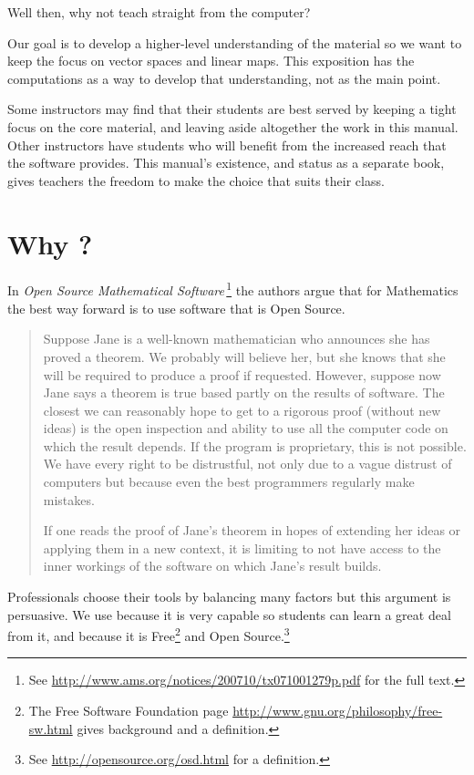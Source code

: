 Well then, why 
not teach straight from the computer?

Our goal is to 
develop a higher-level understanding of the material so we want to  
keep the focus on vector spaces and linear maps.
This exposition has 
the computations as a way to develop that understanding, not as the main point.

Some instructors may find 
that their students are best served by
keeping a tight focus on the
core material, and leaving aside altogether 
the work in this manual. 
Other instructors
have students who will benefit from the increased reach that the software
provides.
This manual's existence, and status as a separate book, 
gives teachers the freedom
to make the choice that suits their class.


\section{Why \Sage?}
In 
\textit{Open Source Mathematical Software\,}\citep{JoynerStein07}\footnote{See 
\protect\url{http://www.ams.org/notices/200710/tx071001279p.pdf} for the 
full text.}
the authors argue that for Mathematics the best way forward
is to use software that is Open Source.

\begin{quotation}\small
Suppose Jane is a well-known mathematician who announces
she has proved a theorem. We probably will believe
her, but she knows that she will be required to produce
a proof if requested. However, suppose now Jane says a
theorem is true based partly on the results of software. The
closest we can reasonably hope to get to a rigorous proof
(without new ideas) is the open inspection and ability to use
all the computer code on which the result depends. If the
program is proprietary, this is not possible. We have every
right to be distrustful, not only due to a vague distrust of
computers but because even the best programmers regularly
make mistakes.

If one reads the proof of Jane’s theorem in hopes of
extending her ideas or applying them in a new context, it
is limiting to not have access to the inner workings of the
software on which Jane’s result builds.
\end{quotation}  
Professionals choose their tools by balancing many factors but
this argument is persuasive.
We use \Sage{} because it is very capable 
so students can 
learn a great deal from it,
and because it is 
Free\footnote{The Free Software Foundation page 
\protect\url{http://www.gnu.org/philosophy/free-sw.html} 
gives background and a definition.} 
and Open Source.\footnote{See \protect\url{http://opensource.org/osd.html} 
for a definition.} 



